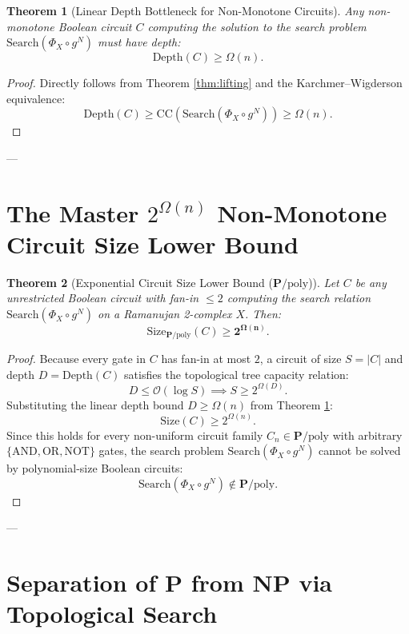 \documentclass[11pt,a4paper]{article}
\theoremstyle{plain}
\newtheorem{theorem}{Theorem}[section]
\theoremstyle{definition}
\theoremstyle{remark}
\newcommand{\Size}{\mathrm{Size}}
\newcommand{\Depth}{\mathrm{Depth}}
\newcommand{\CC}{\mathrm{CC}}
\newcommand{\Search}{\mathrm{Search}}
\begin{document}
\begin{theorem}[Linear Depth Bottleneck for Non-Monotone Circuits]\label{thm:depth_bound}
Any non-monotone Boolean circuit $C$ computing the solution to the search problem $\Search(\Phi_X \circ g^N)$ must have depth:
\[
\Depth(C) \ge \Omega(n).
\]
\end{theorem}

\begin{proof}
Directly follows from Theorem \ref{thm:lifting} and the Karchmer--Wigderson equivalence:
\[
\Depth(C) \ge \CC(\Search(\Phi_X \circ g^N)) \ge \Omega(n).
\]
\end{proof}

---

\section{The Master $2^{\Omega(n)}$ Non-Monotone Circuit Size Lower Bound}

\begin{theorem}[Exponential Circuit Size Lower Bound ($\mathbf{P}/\mathrm{poly}$)]\label{thm:master_circuit_size}
Let $C$ be any unrestricted Boolean circuit with fan-in $\le 2$ computing the search relation $\Search(\Phi_X \circ g^N)$ on a Ramanujan 2-complex $X$. Then:
\[
\Size_{\mathbf{P}/\mathrm{poly}}(C) \ge \mathbf{2^{\Omega(n)}}.
\]
\end{theorem}

\begin{proof}
Because every gate in $C$ has fan-in at most $2$, a circuit of size $S = |C|$ and depth $D = \Depth(C)$ satisfies the topological tree capacity relation:
\[
D \le \mathcal{O}(\log S) \implies S \ge 2^{\Omega(D)}.
\]
Substituting the linear depth bound $D \ge \Omega(n)$ from Theorem \ref{thm:depth_bound}:
\[
\Size(C) \ge 2^{\Omega(n)}.
\]
Since this holds for every non-uniform circuit family $C_n \in \mathbf{P}/\mathrm{poly}$ with arbitrary $\{\mathrm{AND}, \mathrm{OR}, \mathrm{NOT}\}$ gates, the search problem $\Search(\Phi_X \circ g^N)$ cannot be solved by polynomial-size Boolean circuits:
\[
\Search(\Phi_X \circ g^N) \notin \mathbf{P}/\mathrm{poly}.
\]
\end{proof}

---

\section{Separation of $\mathbf{P}$ from $\mathbf{NP}$ via Topological Search}
\end{document}
